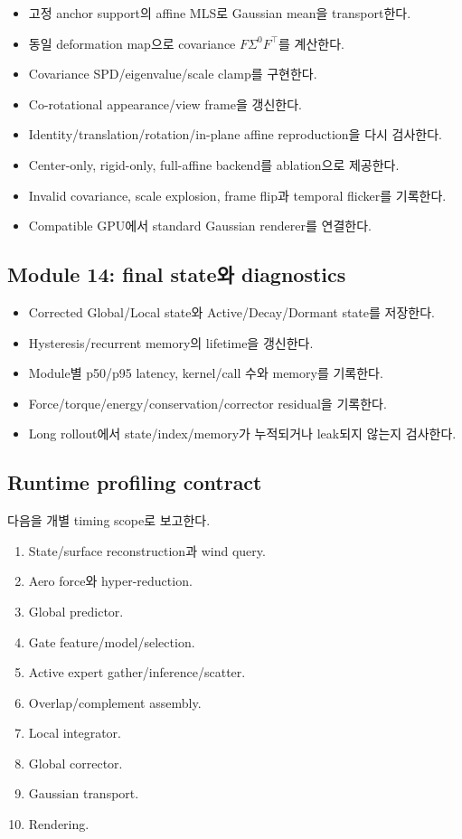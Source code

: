 \documentclass[10pt,a4paper]{article}
\newcommand{\todo}{\textcolor{TodoGray}{\(\square\)}}
\begin{document}
\begin{itemize}
  \item[\todo] 고정 anchor support의 affine MLS로 Gaussian mean을 transport한다.
  \item[\todo] 동일 deformation map으로 covariance \(F\Sigma^0F^\top\)를 계산한다.
  \item[\todo] Covariance SPD/eigenvalue/scale clamp를 구현한다.
  \item[\todo] Co-rotational appearance/view frame을 갱신한다.
  \item[\todo] Identity/translation/rotation/in-plane affine reproduction을 다시 검사한다.
  \item[\todo] Center-only, rigid-only, full-affine backend를 ablation으로 제공한다.
  \item[\todo] Invalid covariance, scale explosion, frame flip과 temporal flicker를 기록한다.
  \item[\todo] Compatible GPU에서 standard Gaussian renderer를 연결한다.
\end{itemize}

\subsection*{Module 14: final state와 diagnostics}

\begin{itemize}
  \item[\todo] Corrected Global/Local state와 Active/Decay/Dormant state를 저장한다.
  \item[\todo] Hysteresis/recurrent memory의 lifetime을 갱신한다.
  \item[\todo] Module별 p50/p95 latency, kernel/call 수와 memory를 기록한다.
  \item[\todo] Force/torque/energy/conservation/corrector residual을 기록한다.
  \item[\todo] Long rollout에서 state/index/memory가 누적되거나 leak되지 않는지 검사한다.
\end{itemize}

\subsection*{Runtime profiling contract}

다음을 개별 timing scope로 보고한다.

\begin{enumerate}
  \item State/surface reconstruction과 wind query.
  \item Aero force와 hyper-reduction.
  \item Global predictor.
  \item Gate feature/model/selection.
  \item Active expert gather/inference/scatter.
  \item Overlap/complement assembly.
  \item Local integrator.
  \item Global corrector.
  \item Gaussian transport.
  \item Rendering.
\end{enumerate}
\end{document}
